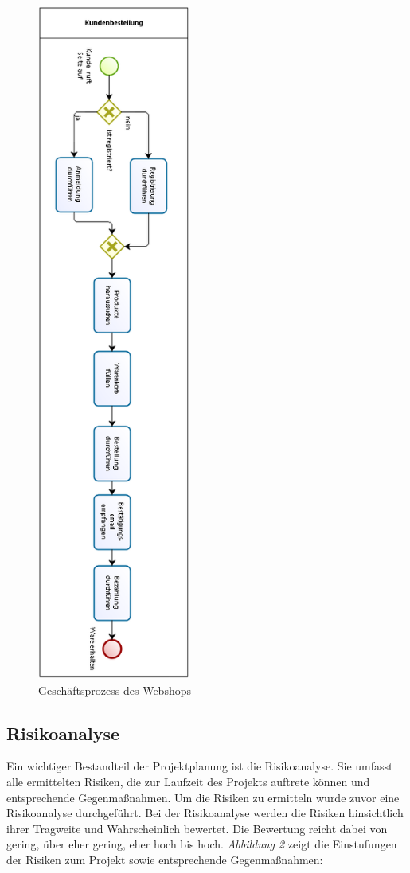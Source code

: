 \begin{figure}[H] 
  \centering
     \includegraphics[width=50mm]{Bilder/Abbildung1-Geschaeftsprozess.png}
  \caption{Geschäftsprozess des Webshops}
  \label{fig:Abbildung 1}
\end{figure}


\subsection{Risikoanalyse}

Ein wichtiger Bestandteil der Projektplanung ist die Risikoanalyse. Sie umfasst alle ermittelten Risiken, die zur Laufzeit des Projekts auftrete können und entsprechende Gegenmaßnahmen. Um die Risiken zu ermitteln wurde zuvor eine Risikoanalyse durchgeführt. Bei der Risikoanalyse werden die Risiken hinsichtlich ihrer Tragweite und Wahrscheinlich bewertet. Die Bewertung reicht dabei von gering, über eher gering, eher hoch bis hoch. \textit{Abbildung 2} zeigt die Einstufungen der Risiken zum Projekt sowie entsprechende Gegenmaßnahmen:

